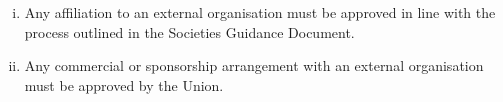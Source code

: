 \begin{enumerate}[i.]
    \item Any affiliation to an external organisation must be approved in line with the process outlined in the Societies Guidance Document.
    \item Any commercial or sponsorship arrangement with an external organisation must be approved by the Union.
\end{enumerate}